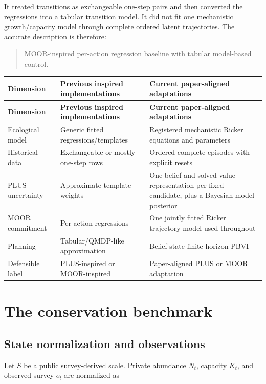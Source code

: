 \documentclass[11pt]{article}
\begin{document}
It treated transitions as exchangeable one-step pairs and then converted the regressions into a
tabular transition model. It did not fit one mechanistic growth/capacity model through complete
ordered latent trajectories. The accurate description is therefore:

\begin{quote}
MOOR-inspired per-action regression baseline with tabular model-based control.
\end{quote}

\begin{longtable}{L{0.20\textwidth}L{0.35\textwidth}L{0.35\textwidth}}
\toprule
\textbf{Dimension} & \textbf{Previous inspired implementations} & \textbf{Current paper-aligned adaptations} \\
\midrule
\endfirsthead
\toprule
\textbf{Dimension} & \textbf{Previous inspired implementations} & \textbf{Current paper-aligned adaptations} \\
\midrule
\endhead
Ecological model & Generic fitted regressions/templates & Registered mechanistic Ricker equations and parameters \\
Historical data & Exchangeable or mostly one-step rows & Ordered complete episodes with explicit resets \\
PLUS uncertainty & Approximate template weights & One belief and solved value representation per fixed candidate, plus a Bayesian model posterior \\
MOOR commitment & Per-action regressions & One jointly fitted Ricker trajectory model used throughout \\
Planning & Tabular/QMDP-like approximation & Belief-state finite-horizon PBVI \\
Defensible label & PLUS-inspired or MOOR-inspired & Paper-aligned PLUS or MOOR adaptation \\
\bottomrule
\end{longtable}

\section{The conservation benchmark}

\subsection{State normalization and observations}

Let $S$ be a public survey-derived scale. Private abundance $N_t$, capacity $K_t$, and observed
survey $o_t$ are normalized as
\end{document}
